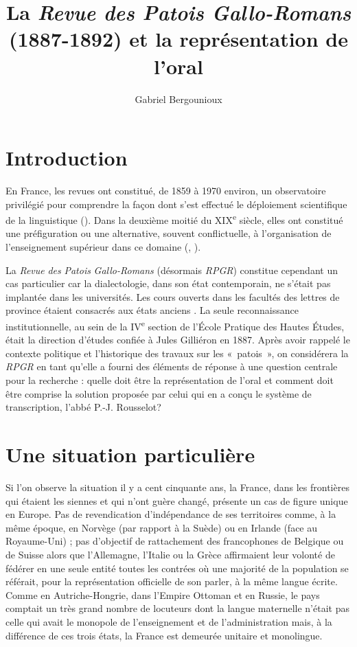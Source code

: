 \documentclass[output=paper]{langsci/langscibook}
\author{Gabriel Bergounioux\affiliation{Université d’Orléans / LLL – UMR 7270}\orcid{}}
\title{La \textit{Revue des Patois Gallo-Romans} (1887-1892) et la représentation de l’oral}
\begin{document}
\maketitle

\section*{Introduction} 

En France, les revues ont constitué, de 1859 à 1970 environ, un observatoire privilégié pour comprendre la façon dont s’est effectué le déploiement scientifique de la linguistique (\citealt{bergounioux_science_1984}\citealt{chevalier_combats_2006}). Dans la deuxième moitié du XIX\textsuperscript{e} siècle, elles ont constitué une préfiguration \citep{Bergounioux1997} ou une alternative, souvent conflictuelle, à l’organisation de l’enseignement supérieur dans ce domaine (\citealt{desmet_linguistique_1996}, \citealt{bergounioux_les_2002}).

La \textit{Revue} \textit{des} \textit{Patois} \textit{Gallo-Romans} (désormais \textit{RPGR}) constitue cependant un cas particulier car la dialectologie, dans son état contemporain, ne s’était pas implantée dans les universités. Les cours ouverts dans les facultés des lettres de province étaient consacrés aux états anciens \citep{bergounioux_science_1984}. La seule reconnaissance institutionnelle, au sein de la IV\textsuperscript{e} section de l’École Pratique des Hautes Études, était la direction d’études confiée à Jules Gilliéron en 1887. Après avoir rappelé le contexte politique et l’historique des travaux sur les «~patois~», on considérera la \textit{RPGR} en tant qu’elle a fourni des éléments de réponse à une question centrale pour la recherche : quelle doit être la représentation de l’oral et comment doit être comprise la solution proposée par celui qui en a conçu le système de transcription, l’abbé P.-J. Rousselot?

\section{Une situation particulière}

Si l’on observe la situation il y a cent cinquante ans, la France, dans les frontières qui étaient les siennes et qui n’ont guère changé, présente un cas de figure unique en Europe. Pas de revendication d’indépendance de ses territoires comme, à la même époque, en Norvège (par rapport à la Suède) ou en Irlande (face au Royaume-Uni) ; pas d’objectif de rattachement des francophones de Belgique ou de Suisse alors que l’Allemagne, l’Italie ou la Grèce affirmaient leur volonté de fédérer en une seule entité toutes les contrées où une majorité de la population se référait, pour la représentation officielle de son parler, à la même langue écrite. Comme en Autriche-Hongrie, dans l’Empire Ottoman et en Russie, le pays comptait un très grand nombre de locuteurs dont la langue maternelle n’était pas celle qui avait le monopole de l’enseignement et de l’administration mais, à la différence de ces trois états, la France est demeurée unitaire et monolingue.
\end{document}
